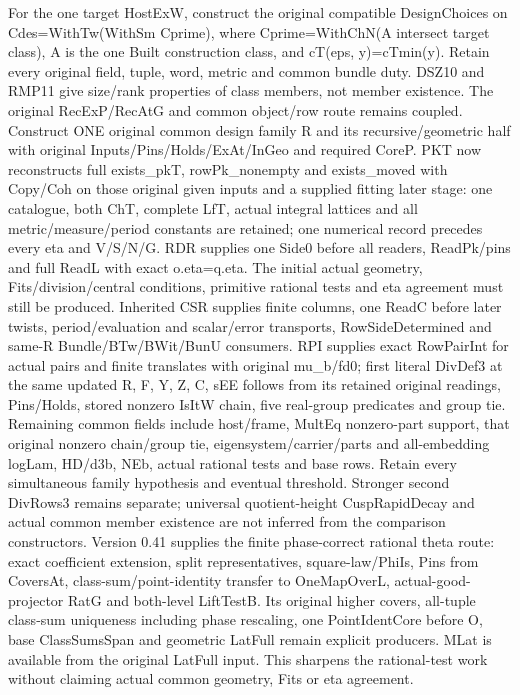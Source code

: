 \documentclass[11pt,a4paper]{article}
\numberwithin{equation}{section}
\theoremstyle{remark}\newtheorem{remark}[theorem]{Remark}
\begin{document}
For the one target HostExW, construct the original compatible DesignChoices on Cdes=WithTw(WithSm Cprime), where Cprime=WithChN(A intersect target class), A is the one Built construction class, and cT(eps,\allowbreak{} y)=cTmin(y). Retain every original field, tuple, word, metric and common bundle duty. DSZ10 and RMP11 give size/\allowbreak{}rank properties of class members, not member existence. The original RecExP/\allowbreak{}RecAtG and common object/\allowbreak{}row route remains coupled. Construct ONE original common design family R and its recursive/\allowbreak{}geometric half with original Inputs/\allowbreak{}Pins/\allowbreak{}Holds/\allowbreak{}ExAt/\allowbreak{}InGeo and required CoreP. PKT now reconstructs full exists\_\allowbreak{}pkT, rowPk\_\allowbreak{}nonempty and exists\_\allowbreak{}moved with Copy/\allowbreak{}Coh on those original given inputs and a supplied fitting later stage: one catalogue, both ChT, complete LfT, actual integral lattices and all metric/\allowbreak{}measure/\allowbreak{}period constants are retained; one numerical record precedes every eta and V/\allowbreak{}S/\allowbreak{}N/\allowbreak{}G. RDR supplies one Side0 before all readers, ReadPk/\allowbreak{}pins and full ReadL with exact o.eta=q.eta. The initial actual geometry, Fits/\allowbreak{}division/\allowbreak{}central conditions, primitive rational tests and eta agreement must still be produced. Inherited CSR supplies finite columns, one ReadC before later twists, period/\allowbreak{}evaluation and scalar/\allowbreak{}error transports, RowSideDetermined and same-R Bundle/\allowbreak{}BTw/\allowbreak{}BWit/\allowbreak{}BunU consumers. RPI supplies exact RowPairInt for actual pairs and finite translates with original mu\_\allowbreak{}b/\allowbreak{}fd0; first literal DivDef3 at the same updated R,\allowbreak{} F,\allowbreak{} Y,\allowbreak{} Z,\allowbreak{} C,\allowbreak{} sEE follows from its retained original readings, Pins/\allowbreak{}Holds, stored nonzero IsItW chain, five real-group predicates and group tie. Remaining common fields include host/\allowbreak{}frame, MultEq nonzero-part support, that original nonzero chain/\allowbreak{}group tie, eigensystem/\allowbreak{}carrier/\allowbreak{}parts and all-embedding logLam, HD/\allowbreak{}d3b, NEb, actual rational tests and base rows. Retain every simultaneous family hypothesis and eventual threshold. Stronger second DivRows3 remains separate; universal quotient-height CuspRapidDecay and actual common member existence are not inferred from the comparison constructors. Version 0.41 supplies the finite phase-correct rational theta route: exact coefficient extension, split representatives, square-law/\allowbreak{}PhiIs, Pins from CoversAt, class-sum/\allowbreak{}point-identity transfer to OneMapOverL, actual-good-projector RatG and both-level LiftTestB. Its original higher covers, all-tuple class-sum uniqueness including phase rescaling, one PointIdentCore before O, base ClassSumsSpan and geometric LatFull remain explicit producers. MLat is available from the original LatFull input. This sharpens the rational-test work without claiming actual common geometry, Fits or eta agreement.
\end{document}
